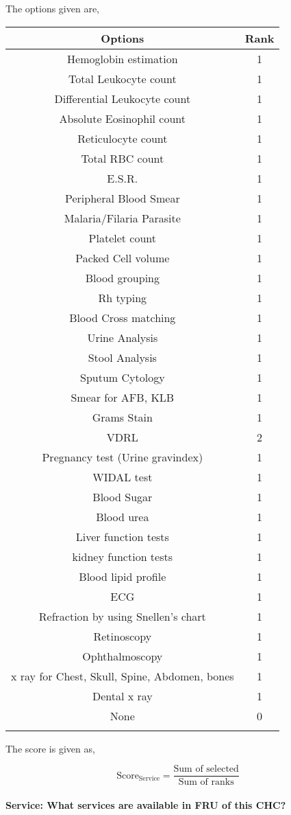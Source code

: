 \documentclass[oneside]{article}
\newcommand{\tsub}[2]{\text{#1}_{\text{#2}}}
\newcommand{\dsub}[2]{\dfrac{\text{#1}}{\text{#2}}}
\newcommand{\multsel}[1]
{
	\[
		\tsub{Score}{#1} = \dsub{Sum of selected}{Sum of ranks}
	\]
}
\newenvironment{ttable}
{
\begin{center}
\begin{tabular}{c|c}
\hline
}
{
\\ \hline
\end{tabular}
\end{center}
}
\begin{document}
The options given are,
\begin{ttable}
Options & Rank \\ \hline
Hemoglobin estimation & 1 \\
Total Leukocyte count & 1 \\
Differential Leukocyte count & 1 \\
Absolute Eosinophil count & 1 \\
Reticulocyte count & 1 \\
Total RBC count & 1 \\
E.S.R. & 1 \\
Peripheral Blood Smear & 1 \\
Malaria/Filaria Parasite & 1 \\
Platelet count & 1 \\
Packed Cell volume & 1 \\
Blood grouping & 1 \\
Rh typing & 1 \\
Blood Cross matching & 1 \\
Urine Analysis & 1 \\
Stool Analysis & 1 \\
Sputum Cytology & 1 \\
Smear for AFB, KLB & 1 \\
Grams Stain & 1 \\
VDRL & 2 \\
Pregnancy test (Urine gravindex) & 1 \\
WIDAL test & 1 \\
Blood Sugar & 1 \\
Blood urea & 1 \\
Liver function tests & 1 \\
kidney function tests & 1 \\
Blood lipid profile & 1 \\
ECG & 1 \\
Refraction by using Snellen's chart & 1 \\
Retinoscopy & 1 \\
Ophthalmoscopy & 1 \\
x ray for Chest, Skull, Spine, Abdomen, bones & 1 \\
Dental x ray & 1 \\
None & 0 \\
\hline
\end{ttable}
The score is given as,
\multsel{Service}
\paragraph{Service: What services are available in FRU of this CHC?}
\end{document}
